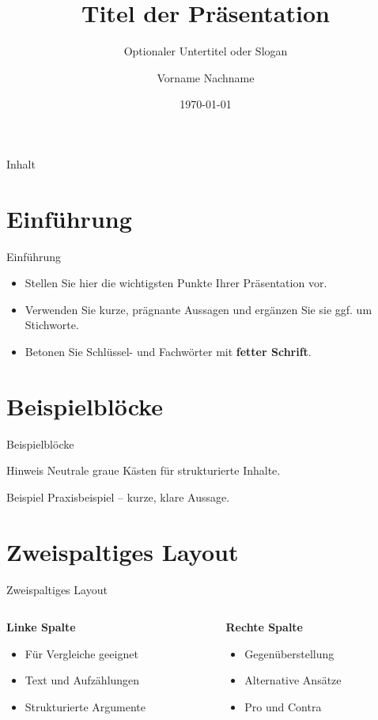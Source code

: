 \documentclass[aspectratio=169,10pt]{beamer}
\title{Titel der Präsentation}
\subtitle{Optionaler Untertitel oder Slogan}
\author{Vorname Nachname}
\institute{Organisation oder Unternehmen \\ Abteilung oder Fakultät}
\date{\today}
\begin{document}
\begin{frame}[plain]
  \titlepage
\end{frame}

\begin{frame}{Inhalt}
  \tableofcontents
\end{frame}

\section{Einführung}
\begin{frame}{Einführung}
\begin{itemize}
  \item Stellen Sie hier die wichtigsten Punkte Ihrer Präsentation vor.
  \item Verwenden Sie kurze, prägnante Aussagen und ergänzen Sie sie ggf. um Stichworte.
  \item Betonen Sie Schlüssel- und Fachwörter mit \textbf{fetter Schrift}.
\end{itemize}
\end{frame}

\section{Beispielblöcke}
\begin{frame}{Beispielblöcke}
\begin{block}{Hinweis}
  Neutrale graue Kästen für strukturierte Inhalte.
\end{block}
\begin{exampleblock}{Beispiel}
  Praxisbeispiel – kurze, klare Aussage.
\end{exampleblock}
\end{frame}

\section{Zweispaltiges Layout}
\begin{frame}{Zweispaltiges Layout}
\begin{columns}[T] %
  \begin{column}{0.48\textwidth}
    \textbf{Linke Spalte}
    \begin{itemize}
      \item Für Vergleiche geeignet
      \item Text und Aufzählungen
      \item Strukturierte Argumente
    \end{itemize}
  \end{column}
  \hfill
  \begin{column}{0.48\textwidth}
    \textbf{Rechte Spalte}
    \begin{itemize}
      \item Gegenüberstellung
      \item Alternative Ansätze
      \item Pro und Contra
    \end{itemize}
  \end{column}
\end{columns}
\end{frame}
\end{document}
